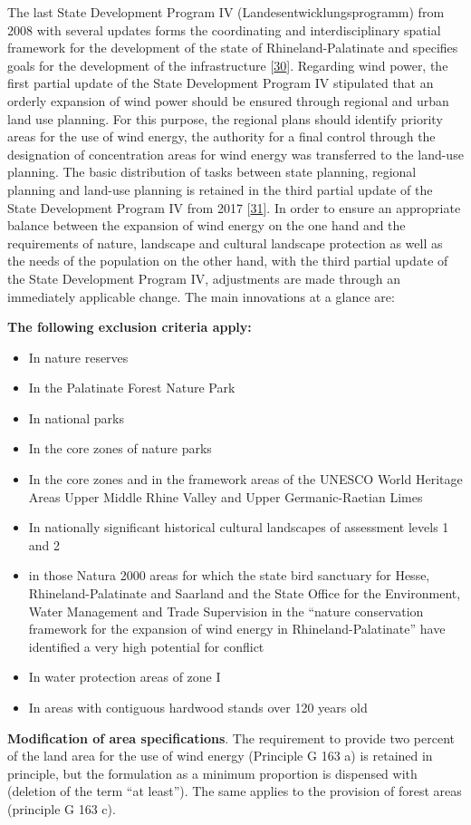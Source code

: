 \documentclass[a4paper,11pt]{article}
\providecommand{\tightlist}{%
  \setlength{\itemsep}{0pt}\setlength{\parskip}{0pt}}
\begin{document}
The last State Development Program IV (Landesentwicklungsprogramm) from 2008 with several updates forms the coordinating and interdisciplinary spatial framework for the development of the state of Rhineland-Palatinate and specifies goals for the development of the infrastructure {[}\protect\hyperlink{ref-MinisteriumdesInnernundfurSport.2008}{30}{]}. Regarding wind power, the first partial update of the State Development Program IV stipulated that an orderly expansion of wind power should be ensured through regional and urban land use planning. For this purpose, the regional plans should identify priority areas for the use of wind energy, the authority for a final control through the designation of concentration areas for wind energy was transferred to the land-use planning. The basic distribution of tasks between state planning, regional planning and land-use planning is retained in the third partial update of the State Development Program IV from 2017 {[}\protect\hyperlink{ref-MinisteriumdesInnernundfurSport.2017}{31}{]}. In order to ensure an appropriate balance between the expansion of wind energy on the one hand and the requirements of nature, landscape and cultural landscape protection as well as the needs of the population on the other hand, with the third partial update of the State Development Program IV, adjustments are made through an immediately applicable change. The main innovations at a glance are:

\textbf{The following exclusion criteria apply:}
\begin{itemize}
\tightlist
\item
  In nature reserves
\item
  In the Palatinate Forest Nature Park
\item
  In national parks
\item
  In the core zones of nature parks
\item
  In the core zones and in the framework areas of the UNESCO World Heritage Areas Upper Middle Rhine Valley and Upper Germanic-Raetian Limes
\item
  In nationally significant historical cultural landscapes of assessment levels 1 and 2
\item
  in those Natura 2000 areas for which the state bird sanctuary for Hesse, Rhineland-Palatinate and Saarland and the State Office for the Environment, Water Management and Trade Supervision in the ``nature conservation framework for the expansion of wind energy in Rhineland-Palatinate'' have identified a very high potential for conflict
\item
  In water protection areas of zone I
\item
  In areas with contiguous hardwood stands over 120 years old
\end{itemize}
\textbf{Modification of area specifications}. The requirement to provide two percent of the land area for the use of wind energy (Principle G 163 a) is retained in principle, but the formulation as a minimum proportion is dispensed with (deletion of the term ``at least''). The same applies to the provision of forest areas (principle G 163 c).
\end{document}
